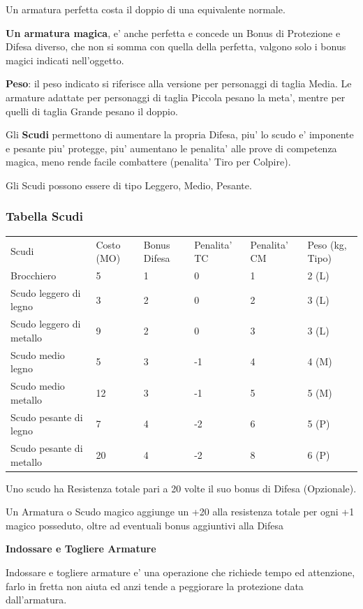 \documentclass[a4paper,11pt,twoside,openany]{dndbook}
\begin{document}
{Un armatura perfetta costa il doppio di una equivalente normale.

\textbf{Un armatura magica}, e' anche perfetta e concede un Bonus di Protezione e Difesa diverso, che non si somma con quella della perfetta, valgono solo i bonus magici indicati nell'oggetto.

\textbf{Peso}: il peso indicato si riferisce alla versione per personaggi di taglia Media. Le armature adattate per personaggi di taglia Piccola pesano la meta', mentre per quelli di taglia Grande pesano il doppio.

\pagebreak

Gli \textbf{Scudi} permettono di aumentare la propria Difesa, piu' lo scudo e' imponente e pesante piu' protegge, piu' aumentano le penalita' alle prove di competenza magica, meno rende facile combattere (penalita' Tiro per Colpire).

Gli Scudi possono essere di tipo Leggero, Medio, Pesante.

\subsubsection{Tabella Scudi}

\label{tabella-scudi}

\begin{tabular}[c]{@{}llllll@{}}
\toprule 
Scudi & Costo (MO) & Bonus Difesa & Penalita' TC & Penalita' CM & Peso (kg, Tipo)\tabularnewline
Brocchiero & 5 & 1 & 0 & 1 & 2 (L)\tabularnewline
Scudo leggero di legno & 3 & 2 & 0 & 2 & 3 (L)\tabularnewline
Scudo leggero di metallo & 9 & 2 & 0 & 3 & 3 (L)\tabularnewline
Scudo medio legno & 5 & 3 & -1 & 4 & 4 (M)\tabularnewline
Scudo medio metallo & 12 & 3 & -1 & 5 & 5 (M)\tabularnewline
Scudo pesante di legno & 7 & 4 & -2 & 6 & 5 (P)\tabularnewline
Scudo pesante di metallo & 20 & 4 & -2 & 8 & 6 (P)\tabularnewline
\bottomrule
\end{tabular}

Uno scudo ha Resistenza totale pari a 20 volte il suo bonus di Difesa (Opzionale).

\bigskip

Un Armatura o Scudo magico aggiunge un +20 alla resistenza totale
per ogni +1 magico posseduto, oltre ad eventuali bonus aggiuntivi
alla Difesa 

\bigskip
\textbf{Indossare e Togliere Armature}
\bigskip

Indossare e togliere armature e' una operazione che richiede tempo ed attenzione, farlo in fretta non aiuta ed anzi tende a peggiorare la protezione data dall'armatura.

}
\end{document}
